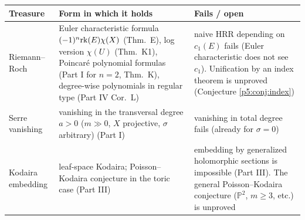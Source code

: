 \begin{center}\small
\begin{tabular}{>{\raggedright\arraybackslash}p{2.6cm}>{\raggedright\arraybackslash}p{6.2cm}>{\raggedright\arraybackslash}p{6.0cm}}
\toprule Treasure & Form in which it holds & Fails / open\\\midrule
Riemann--Roch & Euler characteristic formula $(-1)^n\mathrm{rk}(E)\chi(X)$ (Thm.\ E), log version $\chi(U)$ (Thm.\ K1), Poincar\'e polynomial formulas (Part I for $n=2$, Thm.\ K), degree-wise polynomials in regular type (Part IV Cor.\ L) & naive HRR depending on $c_1(E)$ fails (Euler characteristic does not see $c_1$). Unification by an index theorem is unproved (Conjecture \ref{p5:conj:index})\\\midrule
Serre vanishing & vanishing in the transversal degree $a>0$ ($m\gg0$, $X$ projective, $\sigma$ arbitrary) (Part I) & vanishing in total degree fails (already for $\sigma=0$)\\\midrule
Kodaira embedding & leaf-space Kodaira; Poisson--Kodaira conjecture in the toric case (Part III) & embedding by generalized holomorphic sections is impossible (Part III). The general Poisson--Kodaira conjecture ($\mathbb P^2$, $m\ge3$, etc.) is unproved\\\bottomrule
\end{tabular}
\end{center}

